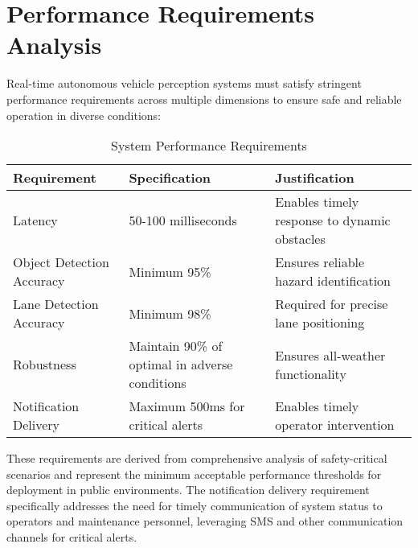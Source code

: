 \section{Performance Requirements Analysis}
\begin{doublespace}
Real-time autonomous vehicle perception systems must satisfy stringent performance requirements across multiple dimensions to ensure safe and reliable operation in diverse conditions:

\begin{table}[h]
\centering
\caption{System Performance Requirements}
\begin{tabular}{|p{3cm}|p{3.5cm}|p{5cm}|}
\hline
\textbf{Requirement} & \textbf{Specification} & \textbf{Justification} \\ \hline
Latency & 50-100 milliseconds & Enables timely response to dynamic obstacles \\ \hline
Object Detection Accuracy & Minimum 95\% & Ensures reliable hazard identification \\ \hline
Lane Detection Accuracy & Minimum 98\% & Required for precise lane positioning \\ \hline
Robustness & Maintain 90\% of optimal in adverse conditions & Ensures all-weather functionality \\ \hline
Notification Delivery & Maximum 500ms for critical alerts & Enables timely operator intervention \\ \hline
\end{tabular}
\end{table}

\par
These requirements are derived from comprehensive analysis of safety-critical scenarios and represent the minimum acceptable performance thresholds for deployment in public environments. The notification delivery requirement specifically addresses the need for timely communication of system status to operators and maintenance personnel, leveraging SMS and other communication channels for critical alerts.
\end{doublespace}

